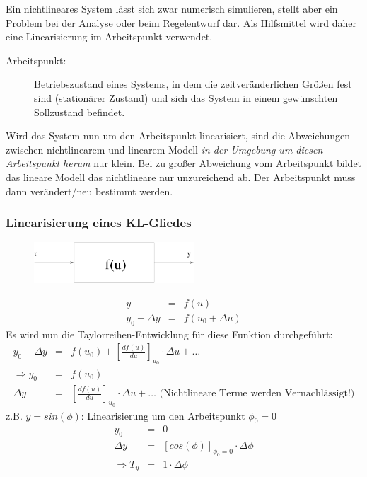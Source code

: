 \documentclass[12pt,a4paper,ngerman]{scrartcl}
\begin{document}
Ein nichtlineares System lässt sich zwar numerisch simulieren, stellt aber ein Problem bei der Analyse oder beim Regelentwurf dar. Als Hilfsmittel wird daher eine Linearisierung im Arbeitspunkt verwendet.
\begin{description}
\item[Arbeitspunkt: ]Betriebszustand eines Systems, in dem die zeitveränderlichen Größen fest sind (stationärer Zustand) und sich das System in einem gewünschten Sollzustand befindet. 
\end{description}
Wird das System nun um den Arbeitspunkt linearisiert, sind die Abweichungen zwischen nichtlinearem und linearem Modell \emph{in der Umgebung um diesen Arbeitspunkt herum }nur klein. Bei zu großer Abweichung vom Arbeitspunkt bildet das lineare Modell das nichtlineare nur unzureichend ab. Der Arbeitspunkt muss dann verändert/neu bestimmt werden. 

\subsubsection*{Linearisierung eines KL-Gliedes}
\begin{figure}[H]
\center
  \includegraphics[width=6cm]{sysregel_klglied}
\end{figure}

\begin{eqnarray*}
  y&=&f(u) \\
y_0+ \Delta y &=& f(u_0+ \Delta u)
\end{eqnarray*}
Es wird nun die Taylorreihen-Entwicklung für diese Funktion durchgeführt:
\begin{eqnarray*}
  y_0+\Delta y &=& f(u_0) + [\frac{df(u)}{du}]_{u_0} \cdot \Delta u + \dots\\
  \Rightarrow y_0& =& f(u_0)\\ \Delta y &=&[\frac{df(u)}{du}]_{u_0} \cdot \Delta u + \dots \text{ (Nichtlineare Terme werden Vernachlässigt!)}
\end{eqnarray*}
z.B. $y=sin(\phi)$: Linearisierung um den Arbeitspunkt $\phi_0 =0$
\begin{eqnarray*}
y_0 &=& 0\\
\Delta y&=& [cos(\phi)]_{\phi_0 =0} \cdot \Delta \phi\\
\Rightarrow T_y &=& 1 \cdot \Delta \phi 
\end{eqnarray*}
\end{document}
